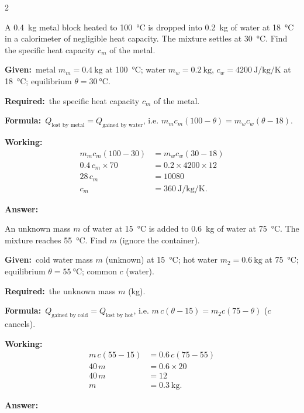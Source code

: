 \documentclass[10pt]{article}
\newcommand{\Given}{\par\vspace{2pt}\textbf{Given:}\ }
\newcommand{\Required}{\par\vspace{2pt}\textbf{Required:}\ }
\newcommand{\Formula}{\par\vspace{2pt}\textbf{Formula:}\ }
\newcommand{\Working}{\par\vspace{2pt}\textbf{Working:}}
\newcommand{\Answer}[1]{\par\vspace{2pt}\textbf{Answer:}\ \fbox{#1}}
\begin{document}
\begin{multicols}{2}
\begin{example}
A \SI{0.4}{\kilogram} metal block heated to \SI{100}{\degreeCelsius} is
dropped into \SI{0.2}{\kilogram} of water at \SI{18}{\degreeCelsius} in
a calorimeter of negligible heat capacity. The mixture settles at
\SI{30}{\degreeCelsius}. Find the specific heat capacity $c_m$ of the
metal.
\tcblower
\Given metal $m_m = \SI{0.4}{\kilogram}$ at
\SI{100}{\degreeCelsius}; water $m_w = \SI{0.2}{\kilogram}$,
$c_w = \SI{4200}{\joule\per\kilogram\per\kelvin}$ at
\SI{18}{\degreeCelsius}; equilibrium $\theta = \SI{30}{\degreeCelsius}$.
\Required the specific heat capacity $c_m$ of the metal.
\Formula $Q_{\text{lost by metal}} = Q_{\text{gained by water}}$, i.e.
$m_m c_m(100 - \theta) = m_w c_w(\theta - 18)$.
\Working
\begin{align*}
  m_m c_m (100 - 30) &= m_w c_w (30 - 18) \\
  0.4 \, c_m \times 70 &= 0.2 \times 4200 \times 12 \\
  28\,c_m &= 10080 \\
  c_m &= \SI{360}{\joule\per\kilogram\per\kelvin}.
\end{align*}
\Answer{$c_m = \SI{360}{\joule\per\kilogram\per\kelvin}$}
\end{example}

\begin{example}
An unknown mass $m$ of water at \SI{15}{\degreeCelsius} is added to
\SI{0.6}{\kilogram} of water at \SI{75}{\degreeCelsius}. The mixture
reaches \SI{55}{\degreeCelsius}. Find $m$ (ignore the container).
\tcblower
\Given cold water mass $m$ (unknown) at \SI{15}{\degreeCelsius};
hot water $m_2 = \SI{0.6}{\kilogram}$ at \SI{75}{\degreeCelsius};
equilibrium $\theta = \SI{55}{\degreeCelsius}$; common $c$ (water).
\Required the unknown mass $m$ (\si{\kilogram}).
\Formula $Q_{\text{gained by cold}} = Q_{\text{lost by hot}}$, i.e.
$m\,c(\theta - 15) = m_2 c(75 - \theta)$ ($c$ cancels).
\Working
\begin{align*}
  m\,c(55 - 15) &= 0.6\,c(75 - 55) \\
  40\,m &= 0.6 \times 20 \\
  40\,m &= 12 \\
  m &= \SI{0.3}{\kilogram}.
\end{align*}
\Answer{$m = \SI{0.3}{\kilogram}$}
\end{example}


\end{multicols}
\end{document}
